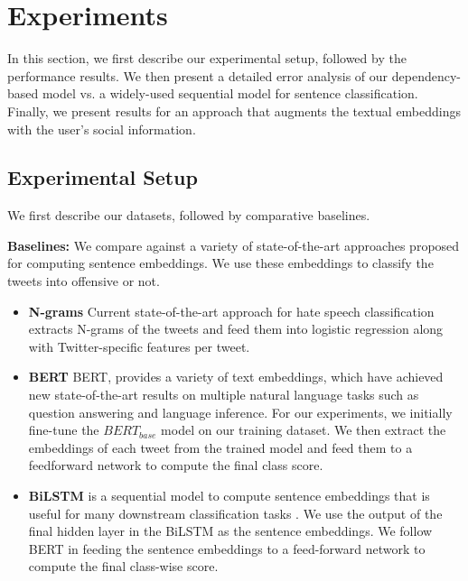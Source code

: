 \section{Experiments}
In this section, we first describe our experimental setup, followed by the performance results. We then present a detailed error analysis of our dependency-based model vs. a widely-used sequential model for sentence classification. Finally, we present results for an approach that augments the textual embeddings with the user's social information.

\subsection{Experimental Setup}
We first describe our datasets, followed by comparative baselines.

\textbf{Baselines:}
We compare against a variety of state-of-the-art approaches proposed for computing sentence embeddings. We use these embeddings to classify the tweets into offensive or not.
\begin{itemize}
\item \textbf{N-grams} Current state-of-the-art approach for hate speech classification \cite{waseem-hovy-2016} extracts N-grams of the tweets and feed them into logistic regression along with Twitter-specific features per tweet.
\item \textbf{BERT} BERT, \citet{devlin2019bert} provides a variety of text embeddings, which have achieved new state-of-the-art results on multiple natural language tasks such as question answering and language inference. For our experiments, we initially fine-tune the $BERT_{base}$ model on our training dataset. We then extract the embeddings of each tweet from the trained model and feed them to a feedforward network to compute the final class score.

\item \textbf{BiLSTM} is a
sequential model to compute sentence embeddings that is useful for many downstream classification tasks \cite{bilstm}. We use the output of the final hidden layer in the BiLSTM as the sentence embeddings.
We follow BERT in feeding the sentence embeddings to a feed-forward network to compute the final class-wise score.
\end{itemize}

